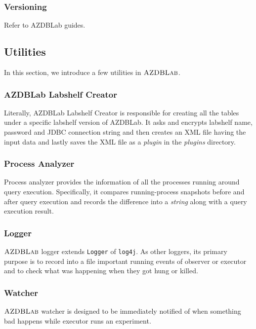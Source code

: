 \documentclass[conference]{IEEEtran}
\def\azdb{\hbox{\sc AZDBLab}}
\begin{document}
\subsubsection{Versioning}
Refer to {\sc AZDBLab} guides. 

\subsection{Utilities}
In this section, we introduce a few utilities in $\azdb$. 

\subsubsection{{\sc AZDBLab} Labshelf Creator}
Literally, {\sc AZDBLab} Labshelf Creator is responsible for creating all the tables under a specific labshelf version 
of {\sc AZDBLab}. It asks and encrypts labshelf name, password and JDBC connection string 
and then creates an XML file having the input data and lastly saves the XML file as a {\em plugin} in the {\em plugins} directory. 

\subsubsection{Process Analyzer}
Process analyzer provides the information of all the processes running around query execution. 
Specifically, it compares running-process snapshots before and after query execution and 
records the difference into a {\em string} along with a query execution result. 

\subsubsection{Logger}
$\azdb$ logger extends {\tt Logger} of {\tt log4j}.  
As other loggers, its primary purpose is to record into a file important running events of observer or executor 
and to check what was happening when they got hung or killed. 	 

\subsubsection{Watcher}
$\azdb$ watcher is designed to be immediately notified of when something bad happens while executor runs an experiment. 
\end{document}

